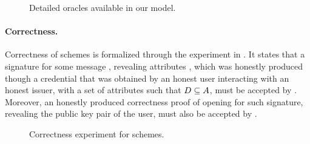 {\begin{figure*}[htp!]
{\begin{minipage}[t]{.5\textwidth}
        
      \end{minipage}
      
    }

    \caption{Detailed oracles available in our model.}
    \label{fig:oracles}
  \end{figure*}
}

\paragraph{Correctness.} %
Correctness of \GSAC schemes is formalized through the experiment in
. It states that a signature for some message \msg,
revealing attributes \DAttrs, which was honestly produced though a credential
that was obtained by an honest user interacting with an honest issuer, with a
set of attributes \Attrs such that $D \subseteq A$, must be accepted
by \Verify. Moreover, an honestly produced correctness proof of opening for such
signature, revealing the public key pair of the user, must also be accepted by
\Judge.

\begin{figure}[htp!]
  \caption{Correctness experiment for \GSAC schemes.}
  \label{fig:exp-gsac-corr}
\end{figure}


